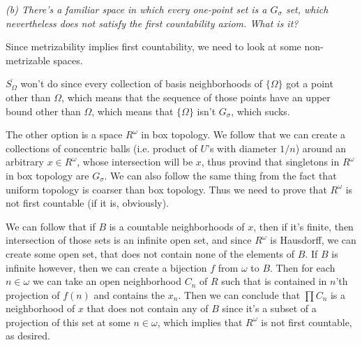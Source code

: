 \documentclass[11pt,oneside,titlepage]{book}
\newcommand{\set}[1]{\{ #1 \}}
\begin{document}
\textit{(b) There's a familiar space in which every one-point set is a $G_\sigma$ set, which
  nevertheless does not satisfy the first countability axiom. What is it?}

Since metrizability implies first countability, we need to look at some non-metrizable spaces.

$\overline{S_\Omega}$ won't do since every collection of basis neighborhoods of $\set{\Omega}$
got a point other than $\Omega$, which means that the sequence of those points have an upper
bound other than $\Omega$, which means that $\set{\Omega}$ isn't $G_\sigma$, which sucks.

The other option is a space $R^\omega$ in box topology. We follow that we can create a
collections of concentric balls (i.e. product of $U$'s with diameter $1/n$)
around an arbitrary $x \in R^\omega$, whose intersection
will be $x$, thus provind that singletons in $R^\omega$ in box topology are $G_\sigma$. We
can also follow the same thing from the fact that uniform topology is coarser than box
topology. Thus we need to prove that $R^\omega$ is not first countable (if it is, obviously).

We can follow that if $B$ is a countable neighborhoods  of $x$, then if it's finite, then
intersection of those sets is an infinite open set, and since $R^\omega$ is Hausdorff,
we can create some open set, that does not contain none of the elements of $B$.
If $B$ is infinite however, then we can create a bijection $f$ from $\omega$ to $B$.
Then for each $n \in \omega$ we can take an open neighborhood $C_n$ of $R$ such that is contained
in $n$'th projection of $f(n)$ and contains the $x_n$. Then we can conclude that
$\prod{C_n}$ is a neighborhood of $x$ that does not contain any of $B$ since it's a subset
of a projection of this set at some $n \in \omega$, which implies that $R^\omega$ is not
first countable, as desired.
\end{document}
